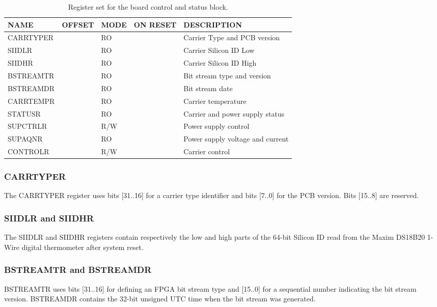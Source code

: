 \documentclass{article}
\begin{document}
\begin{table}[htbp]
  \centering
  \begin{tabularx}{\textwidth}{|l|r|l|l|X|}
    \hline
    \textbf{NAME} & \textbf{OFFSET} & \textbf{MODE} & \textbf{ON RESET} & \textbf{DESCRIPTION} \\
    \hline
    \hline
    CARRTYPER & & RO & & Carrier Type and PCB version\\
    \hline
    SIIDLR & & RO & & Carrier Silicon ID Low \\
    \hline
    SIIDHR & & RO & & Carrier Silicon ID High \\
    \hline
    BSTREAMTR & & RO & & Bit stream type and version \\
    \hline
    BSTREAMDR & & RO & & Bit stream date \\
    \hline
    CARRTEMPR & & RO & & Carrier temperature \\
    \hline
    STATUSR & & RO & & Carrier and power supply status \\
    \hline
    SUPCTRLR & & R/W & & Power supply control \\
    \hline
    SUPAQNR & & RO & & Power supply voltage and current \\
    \hline
    CONTROLR & & R/W & & Carrier control \\
    \hline
  \end{tabularx}
  \caption{Register set for the board control and status block.}
  \label{tab:stat_control}
\end{table}

\subsubsection{CARRTYPER}
The CARRTYPER register uses bits [31..16] for a carrier type identifier and bits [7..0] for the PCB version. Bits [15..8] are reserved. 

\subsubsection{SIIDLR and SIIDHR}
The SIIDLR and SIIDHR registers contain respectively the low and high parts of the 64-bit Silicon ID read from the Maxim DS18B20 1-Wire digital thermometer after system reset. 

\subsubsection{BSTREAMTR and BSTREAMDR}
BSTREAMTR uses bits [31..16] for defining an FPGA bit stream type and [15..0] for a sequential number indicating the bit stream version. BSTREAMDR contains the 32-bit unsigned UTC time when the bit stream was generated. 
\end{document}
